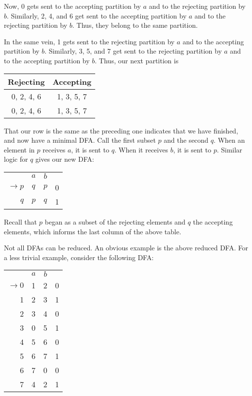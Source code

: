 Now, 0 gets sent to the accepting partition by \(a\) and to the rejecting partition by \(b\). Similarly, 2, 4, and 6 get sent to the accepting partition by \(a\) and to the rejecting partition by \(b\). Thus, they belong to the same partition.

In the same vein, 1 gets sent to the rejecting partition by \(a\) and to the accepting partition by \(b\). Similarly, 3, 5, and 7 get sent to the rejecting partition by \(a\) and to the accepting partition by \(b\). Thus, our next partition is

\begin{center}\begin{tabular}{c c c c c c c c}
\multicolumn{4}{c|}{Rejecting} & \multicolumn{4}{|c}{Accepting}\\\bottomrule
\multicolumn{4}{c|}{0, 2, 4, 6} & \multicolumn{4}{|c}{1, 3, 5, 7}\\
\multicolumn{4}{c|}{0, 2, 4, 6} & \multicolumn{4}{|c}{1, 3, 5, 7}
\end{tabular}\end{center}

That our row is the same as the preceding one indicates that we have finished, and now have a minimal DFA\@. Call the first subset \(p\) and the second \(q\). When an element in \(p\) receives \(a\), it is sent to \(q\). When it receives \(b\), it is sent to \(p\). Similar logic for \(q\) gives our new DFA\@:

\begin{center}\begin{tabular}{r c c r}
         & \(a\) & \(b\) & \\\cmidrule{2-3}
         \(\to p\) & \(q\) & \(p\) & 0\\
               \(q\) & \(p\) & \(q\) & 1\\
    \end{tabular}\end{center}

Recall that \(p\) began as a subset of the rejecting elements and \(q\) the accepting elements, which informs the last column of the above table.
    
Not all DFAs can be reduced. An obvious example is the above reduced DFA\@. For a less trivial example, consider the following DFA\@:
   
    \begin{center}\begin{tabular}{r c c r}
         & \(a\) & \(b\) & \\\cmidrule{2-3}
         \(\to 0\) & 1 & 2 & 0\\
               1 & 2 & 3 & 1\\
               2 & 3 & 4 & 0\\
               3 & 0 & 5 & 1\\
               4 & 5 & 6 & 0\\
               5 & 6 & 7 & 1\\
               6 & 7 & 0 & 0\\
               7 & 4 & 2 & 1
    \end{tabular}\end{center}

